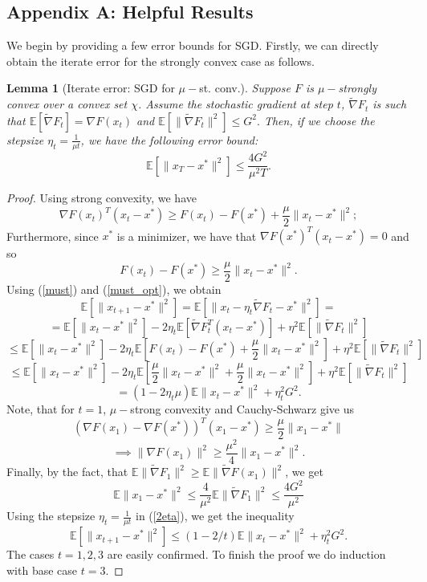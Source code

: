 \documentclass[11pt, twoside]{report}
\newtheorem{lemma}[theorem]{Lemma}
\begin{document}
\subsection*{Appendix A: Helpful Results}
\label{AppendixA}
We begin by providing a few error bounds for SGD. Firstly, we can directly obtain the iterate error for the strongly convex case as follows.
\begin{lemma}[Iterate error: SGD for $\mu-$st. conv.] \label{sgdmu}
    Suppose $F$ is $\mu-$strongly convex over a convex set $\chi$. Assume the stochastic gradient at step $t$, $\tilde{\nabla} F_t$ is such that $\mathbb{E}[\tilde{\nabla} F_t] = \nabla F(x_t)$ and $ \mathbb{E}[\|\tilde{\nabla} F_t\|^2] \leq G^2.$ Then, if we choose the stepsize $\eta_t = \frac{1}{\mu t}$, we have the following error bound:
    \[\mathbb{E}[\|x_T - x^*\|^2] \leq \frac{4G^2}{\mu^2 T}.\]
\end{lemma}
\begin{proof}
    Using strong convexity, we have
        \begin{equation} \label{must}
            \nabla F(x_t)^T(x_t - x^*) \geq F(x_t) - F(x^*) + \frac{\mu}{2}\|x_t - x^*\|^2;
        \end{equation}
        Furthermore, since $x^*$ is a minimizer, we have that $\nabla F(x^*)^T(x_t - x^*) = 0$ and so
        \begin{equation} \label{must_opt}
            F(x_t) - F(x^*) \geq \frac{\mu}{2}\|x_t - x^*\|^2.
        \end{equation}
        Using (\ref{must}) and (\ref{must_opt}), we obtain
        \[\mathbb{E}[\|x_{t+1} - x^*\|^2] = \mathbb{E}[\|x_t - \eta_t \tilde{\nabla} F_t - x^*\|^2] =\]
        \[=\mathbb{E}[\|x_{t} - x^*\|^2] - 2\eta_t \mathbb{E} \left[ \tilde{\nabla} F_t^T(x_t - x^*) \right] + \eta^2 \mathbb{E}[\|\tilde{\nabla} F_t\|^2] \]
        \[\leq \mathbb{E}[\|x_{t} - x^*\|^2] - 2\eta_t \mathbb{E} \left[F(x_t) - F(x^*) + \frac{\mu}{2}\|x_t - x^*\|^2 \right] + \eta^2 \mathbb{E}[\|\tilde{\nabla} F_t\|^2]\]
        \[\leq \mathbb{E}[\|x_{t} - x^*\|^2] - 2\eta_t \mathbb{E} \left[\frac{\mu}{2}\|x_t - x^*\|^2 + \frac{\mu}{2}\|x_t - x^*\|^2 \right] + \eta^2 \mathbb{E}[\|\tilde{\nabla} F_t\|^2] \]
        \begin{equation} \label{2eta}
            = (1-2\eta_t \mu) \mathbb{E}\|x_t - x^*\|^2 + \eta_t^2 G^2.
        \end{equation}
        Note, that for $t=1$, $\mu-$strong convexity and Cauchy-Schwarz give us
        \[(\nabla F(x_1) - \nabla F(x^*))^T(x_1-x^*) \geq \frac{\mu}{2}\|x_1 - x^*\|\]
        \[\implies \|\nabla F(x_1)\|^2 \geq \frac{\mu^2}{4}\|x_1 - x^*\|^2.\]
        Finally, by the fact, that $\mathbb{E}\|\tilde{\nabla}F_1\|^2 \geq \mathbb{E}\|\tilde{\nabla}F(x_1)\|^2$, we get
        \[\mathbb{E}\|x_1 - x^*\|^2 \leq \frac{4}{\mu^2} \mathbb{E}\|\tilde{\nabla}F_1\|^2 \leq \frac{4G^2}{\mu^2}\]
        Using the stepsize $\eta_t = \frac{1}{\mu t}$ in (\ref{2eta}), we get the inequality
        \[\mathbb{E}[\|x_{t+1} - x^*\|^2] \leq (1-2/t) \mathbb{E}\|x_t - x^*\|^2 + \eta_t^2 G^2.\]
        The cases $t=1,2,3$ are easily confirmed. To finish the proof we do induction with base case $t=3$.
\end{proof}
\end{document}
